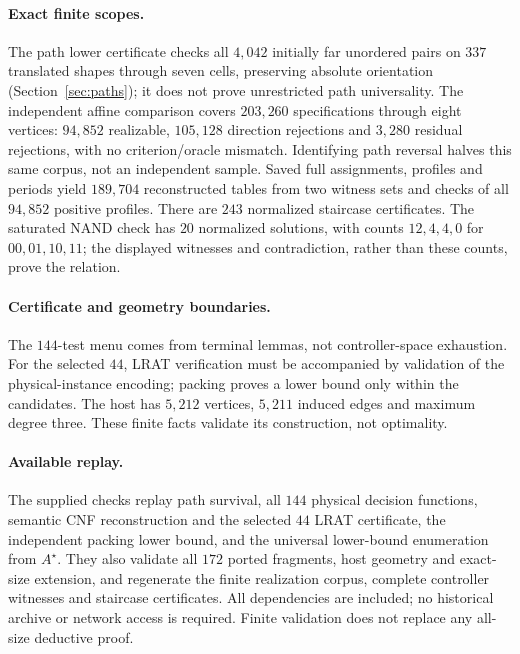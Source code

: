 \paragraph{Exact finite scopes.}
The path lower certificate checks all $4{,}042$ initially far unordered pairs on
$337$ translated shapes through seven cells, preserving absolute orientation
(Section~\ref{sec:paths}); it does not prove unrestricted path universality.
The independent affine comparison covers $203{,}260$ specifications through eight
vertices: $94{,}852$ realizable, $105{,}128$ direction rejections and $3{,}280$
residual rejections, with no criterion/oracle mismatch. Identifying path reversal
halves this same corpus, not an independent sample. Saved full assignments,
profiles and periods yield $189{,}704$ reconstructed tables from two witness sets
and checks of all $94{,}852$ positive profiles. There are $243$ normalized
staircase certificates. The saturated NAND check has $20$ normalized solutions,
with counts $12,4,4,0$ for $00,01,10,11$; the displayed witnesses and contradiction,
rather than these counts, prove the relation.

\paragraph{Certificate and geometry boundaries.}
The $144$-test menu comes from terminal lemmas, not controller-space exhaustion.
For the selected $44$, LRAT verification must be accompanied by validation of the
physical-instance encoding; packing proves a lower bound only within the candidates.
The host has $5{,}212$ vertices, $5{,}211$ induced edges and maximum degree three.
These finite facts validate its construction, not optimality.

\paragraph{Available replay.}
The supplied checks replay path survival, all $144$ physical decision functions,
semantic CNF reconstruction and the selected $44$ LRAT certificate, the independent
packing lower bound, and the universal lower-bound enumeration from $A^\star$.
They also validate all $172$ ported fragments, host geometry and exact-size
extension, and regenerate the finite realization corpus, complete controller
witnesses and staircase certificates. All dependencies are included; no historical
archive or network access is required. Finite validation does not replace any
all-size deductive proof.
